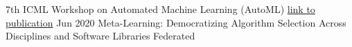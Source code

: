 \begin{cvhonors}
  \cvhonor
    {7th ICML Workshop on Automated Machine Learning (AutoML)}
    {\empty}
    {
    {\empty}
    {\href{https://www.automl.org/wp-content/uploads/2020/07/AutoML_2020_paper_39.pdf}{link to publication}}
    }
    {Jun 2020}
  \cvhon
    {}
    {Meta-Learning: Democratizing Algorithm Selection Across Disciplines and Software Libraries}
    {}
    {Federated}
\end{cvhonors}


